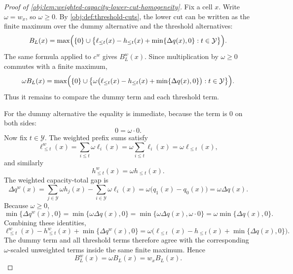 \begin{proof}[Proof of \cref{obj:lem:weighted-capacity-lower-cut-homogeneity}]
Fix a cell \(x\).  Write \(\omega=w_x\), so \(\omega\ge 0\).  By \cref{obj:def:threshold-cuts}, the lower cut can be written as the finite maximum over the dummy alternative and the threshold alternatives:
\[
B_L(x)
=
\max\Bigl(
\{0\}\cup
\bigl\{
\ell_{\le t}(x)-h_{\le t}(x)+\min\{\Delta q(x),0\}:t\in\mathcal Y
\bigr\}
\Bigr).
\]
The same formula applied to \(c^w\) gives \(B_L^w(x)\).  Since multiplication by \(\omega\ge0\) commutes with a finite maximum,
\[
\omega B_L(x)
=
\max\Bigl(
\{0\}\cup
\bigl\{
\omega\bigl(\ell_{\le t}(x)-h_{\le t}(x)+\min\{\Delta q(x),0\}\bigr):t\in\mathcal Y
\bigr\}
\Bigr).
\]
Thus it remains to compare the dummy term and each threshold term. %

For the dummy alternative the equality is immediate, because the term is \(0\) on both sides:
\[
0=\omega\cdot 0 .
\]
Now fix \(t\in\mathcal Y\).  The weighted prefix sums satisfy
\[
\ell_{\le t}^w(x)
=\sum_{i\le t}\omega\ell_i(x)
=\omega\sum_{i\le t}\ell_i(x)
=\omega\ell_{\le t}(x),
\]
and similarly
\[
h_{\le t}^w(x)=\omega h_{\le t}(x).
\]
The weighted capacity-total gap is
\[
\Delta q^w(x)
=
\sum_{j\in\mathcal Y}\omega h_j(x)
-
\sum_{i\in\mathcal Y}\omega\ell_i(x)
=
\omega\bigl(q_1(x)-q_0(x)\bigr)
=
\omega\Delta q(x).
\]
Because \(\omega\ge0\),
\[
\min\{\Delta q^w(x),0\}
=
\min\{\omega\Delta q(x),0\}
=
\min\{\omega\Delta q(x),\omega\cdot0\}
=
\omega\min\{\Delta q(x),0\}.
\]
Combining these identities,
\[
\ell_{\le t}^w(x)-h_{\le t}^w(x)+\min\{\Delta q^w(x),0\}
=
\omega\bigl(\ell_{\le t}(x)-h_{\le t}(x)+\min\{\Delta q(x),0\}\bigr).
\]
The dummy term and all threshold terms therefore agree with the corresponding \(\omega\)-scaled unweighted terms inside the same finite maximum.  Hence
\[
B_L^w(x)=\omega B_L(x)=w_xB_L(x).
\]
\end{proof}
